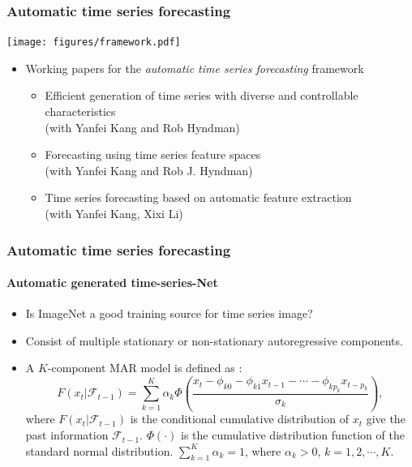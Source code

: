 \documentclass[10pt,aspectratio=43]{beamer}
\begin{document}
\begin{frame}
  \frametitle{Automatic time series forecasting}

  \centerline{\texttt{[image: figures/framework.pdf]}}


  \begin{itemize}
  \item Working papers for the \emph{automatic time series forecasting} framework
    \begin{itemize}
    \item   {\color{blue} Efficient generation of time series with diverse and controllable characteristics}\\
      (with Yanfei Kang and Rob Hyndman)\\
    \item {\color{blue} Forecasting using time series feature spaces}\\
      (with Yanfei Kang and Rob J. Hyndman)\\
    \item {\color{blue} Time series forecasting based on automatic feature extraction}\\
      (with Yanfei Kang,  Xixi Li)
    \end{itemize}
  \end{itemize}
\end{frame}




\begin{frame}
  \frametitle{Automatic time series forecasting}
  \framesubtitle{Automatic generated time-series-Net}
  \begin{itemize}
  \item Is ImageNet a good training source for time series image?

  \item Consist of multiple stationary or non-stationary autoregressive
    components.\\
  \item
    A \(K\)-component MAR model is defined as \citep{wong2000mixture} : \[
      F(x_t|\mathcal{F}_{t-1}) =
      \sum\limits_{k=1}^K\alpha_k\Phi(\frac{x_t-\phi_{k0}-\phi_{k1}x_{t-1}-\cdots
        -\phi_{kp_k}x_{t-p_k}}{\sigma_k}),
    \] where \(F(x_t|\mathcal{F}_{t-1})\) is the conditional cumulative
    distribution of \(x_t\) give the past information
    \(\mathcal{F}_{t-1}\). \(\Phi(\cdot)\) is the cumulative distribution
    function of the standard normal distribution.
    \(\sum_{k=1}^K \alpha_k= 1\), where \(\alpha_k > 0\),
    \(k = 1, 2, \cdots, K\).
  \end{itemize}

\end{frame}
\end{document}
